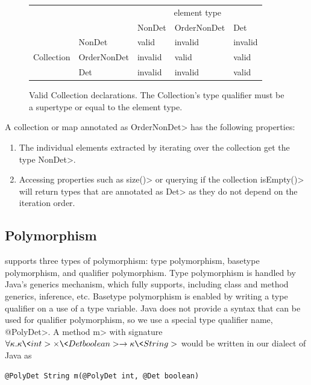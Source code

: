 \begin{figure}
    \centering
    \begin{tabular}{|l|l|l|l|l|}
        \cline{3-5}
        \multicolumn{2}{c|}{~}  &  \multicolumn{3}{c|}{element type} \\ \cline{3-5}
        \multicolumn{2}{c|}{~}  & NonDet     & OrderNonDet & Det \\ \hline
        & NonDet      &   valid    &  invalid    & invalid  \\ \cline{2-5}
        Collection    & OrderNonDet &   invalid  &  valid      & valid  \\ \cline{2-5}
        & Det         &   invalid  &  invalid    & valid      \\ \hline
    \end{tabular}
    \caption{Valid Collection declarations.  The Collection's type qualifier
        must be a supertype or equal to the element type.}
    \label{fig-determinism-collections}
\end{figure}

A collection or map annotated as \<OrderNonDet> has the following properties:
\begin{enumerate}
    \item The individual elements extracted by iterating over the collection get the type \<NonDet>.
    \item Accessing properties such as \<size()> or querying if the collection \<isEmpty()> will return types
    that are annotated as \<Det> as they do not depend on the iteration order. 
\end{enumerate}



\subsection{Polymorphism}\label{polymorphism}

\TheDeterminismChecker supports three types of polymorphism:  type
polymorphism, basetype polymorphism, and qualifier polymorphism.
Type polymorphism is handled by Java's generics mechanism, which
\theDeterminismChecker fully supports, including class and method generics,
inference, etc.
Basetype polymorphism is enabled by writing a type qualifier on a use of a
type variable.
Java does not provide a syntax that can be used for qualifier polymorphism,
so we use a special type qualifier name, \<@PolyDet>.
A method \<m> with signature $\forall \kappa . \kappa \<int> \times \<Det boolean> \rightarrow
\kappa \<String>$ would be written in our dialect of Java as
\begin{Verbatim}
@PolyDet String m(@PolyDet int, @Det boolean)
\end{Verbatim}


